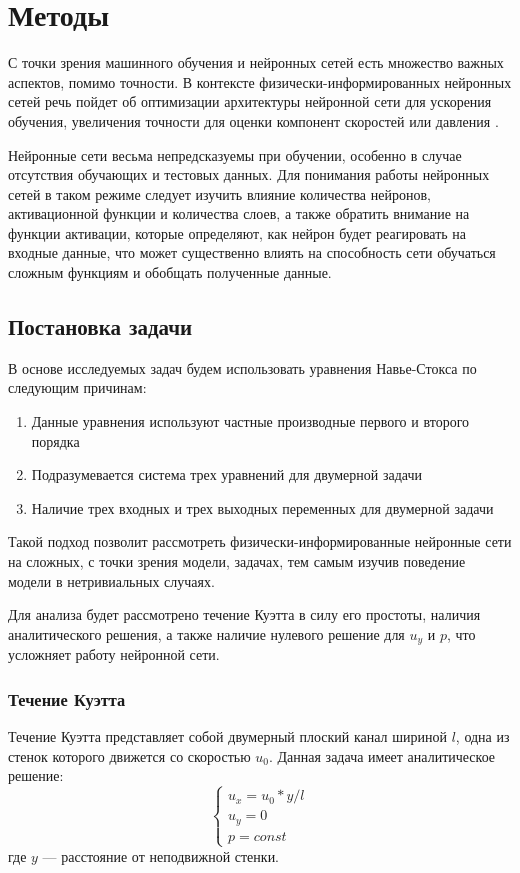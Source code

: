 \chapter{Методы}
С точки зрения машинного обучения и нейронных сетей есть множество важных аспектов,
помимо точности. В контексте физически-информированных нейронных сетей речь пойдет
об оптимизации архитектуры нейронной сети для ускорения обучения, увеличения точности
для оценки компонент скоростей или давления \cite{Tommaso2024pinn}.

Нейронные сети весьма непредсказуемы при обучении, особенно в случае отсутствия
обучающих и тестовых данных. Для понимания работы нейронных сетей в таком режиме
следует изучить влияние количества нейронов, активационной функции и количества слоев,
а также обратить внимание на функции активации, которые определяют,
как нейрон будет реагировать на входные данные, что может существенно влиять на способность
сети обучаться сложным функциям и обобщать полученные данные.
\section{Постановка задачи}
В основе исследуемых задач будем использовать уравнения Навье-Стокса по следующим
причинам:
\begin{enumerate}
    \item Данные уравнения используют частные производные первого и второго порядка
    \item Подразумевается система трех уравнений для двумерной задачи
    \item Наличие трех входных и трех выходных переменных для двумерной задачи
\end{enumerate}
Такой подход позволит рассмотреть физически-информированные нейронные сети на сложных,
с точки зрения модели, задачах, тем самым изучив поведение модели в нетривиальных случаях.

Для анализа будет рассмотрено течение Куэтта в силу его простоты, наличия аналитического
решения, а также наличие нулевого решение для $u_y$ и $p$, что усложняет работу нейронной
сети.
\subsection{Течение Куэтта}

Течение Куэтта представляет собой двумерный плоский канал шириной $l$, одна из стенок которого 
движется со скоростью $u_0$. Данная задача имеет аналитическое решение:
\begin{equation}
    \begin{cases}
        u_x = u_0 * y / l \\
        u_y = 0 \\
        p = const
    \end{cases}
\end{equation}
где $y$ --- расстояние от неподвижной стенки.

